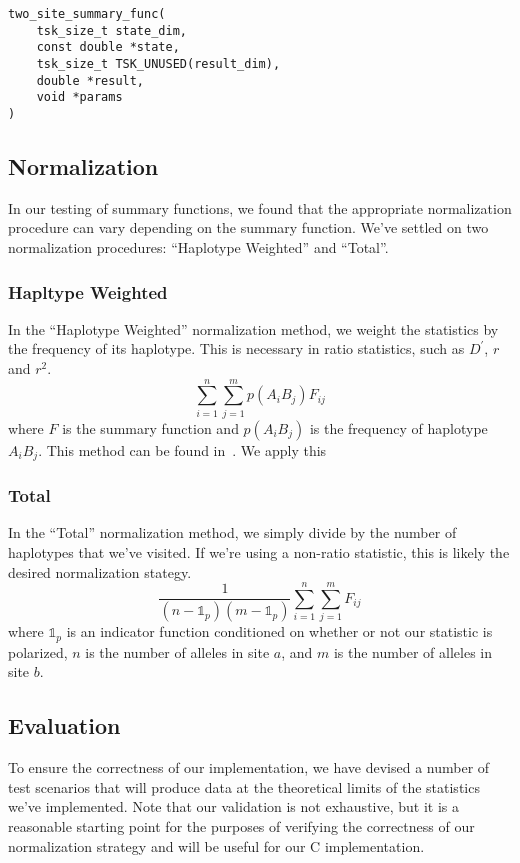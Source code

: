 \documentclass[12pt]{article}
\begin{document}
\begin{verbatim}
two_site_summary_func(
	tsk_size_t state_dim,
	const double *state,
	tsk_size_t TSK_UNUSED(result_dim),
	double *result,
	void *params
)
\end{verbatim}

\subsection{Normalization} \label{section:normalization}
In our testing of summary functions, we found that the appropriate normalization
procedure can vary depending on the summary function. We've settled on two
normalization procedures: ``Haplotype Weighted'' and ``Total''.

\subsubsection{Hapltype Weighted}
In the ``Haplotype Weighted'' normalization method, we weight the statistics by
the frequency of its haplotype. This is necessary in ratio statistics, such as
$D^{\prime}$, $r$ and $r^{2}$.
\[
  \sum_{i=1}^{n}\sum_{j=1}^{m}p(A_{i}B_{j})F_{ij}
\]
where $F$ is the summary function and $p(A_{i}B_{j})$ is the frequency of
haplotype $A_{i}B_{j}$. This method can be found
in~\cite{zhao2007evaluation}. We apply this 
\subsubsection{Total}
In the ``Total'' normalization method, we simply divide by the number of
haplotypes that we've visited. If we're using a non-ratio statistic, this is
likely the desired normalization stategy.
\[
  \frac{1}{(n-\mathbb{1}_{p}) (m-\mathbb{1}_{p})}\sum_{i=1}^{n}\sum_{j=1}^{m}F_{ij}
\]
where $\mathbb{1}_{p}$ is an indicator function conditioned on whether or not
our statistic is polarized, $n$ is the number of alleles in site $a$, and $m$ is
the number of alleles in site $b$.

\subsection{Evaluation}
To ensure the correctness of our implementation, we have devised a number of
test scenarios that will produce data at the theoretical limits of the
statistics we've implemented. Note that our validation is not exhaustive, but it
is a reasonable starting point for the purposes of verifying the correctness of
our normalization strategy and will be useful for our C implementation.
\end{document}
